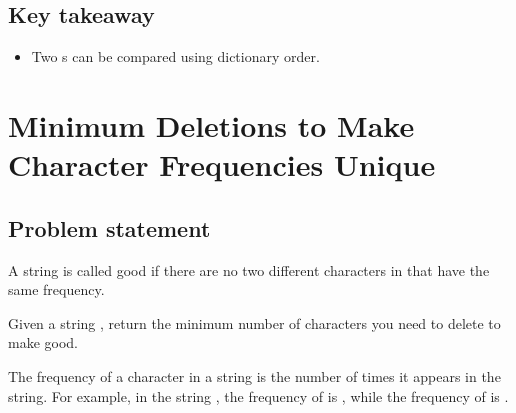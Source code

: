 \documentclass[letterpaper,12pt,english]{book}
\begin{document}
\subsection{Key takeaway}
\label{\detokenize{Sorting/04_SORT_1288_Remove_Covered_Intervals:key-takeaway}}\begin{itemize}
\item {} 
\sphinxAtStartPar
Two s can be compared using dictionary order.

\end{itemize}

\sphinxstepscope


\section{Minimum Deletions to Make Character Frequencies Unique}
\label{\detokenize{Sorting/04_SORT_1647_Minimum_Deletions_to_Make_Character_Frequencies_Unique:minimum-deletions-to-make-character-frequencies-unique}}\label{\detokenize{Sorting/04_SORT_1647_Minimum_Deletions_to_Make_Character_Frequencies_Unique::doc}}

\subsection{Problem statement\sphinxfootnotemark[77]}
\label{\detokenize{Sorting/04_SORT_1647_Minimum_Deletions_to_Make_Character_Frequencies_Unique:problem-statement}}%
\begin{footnotetext}[77]\sphinxAtStartFootnote
{}
%
\end{footnotetext}\ignorespaces 
\sphinxAtStartPar
A string  is called good if there are no two different characters in  that have the same frequency.

\sphinxAtStartPar
Given a string , return the minimum number of characters you need to delete to make  good.

\sphinxAtStartPar
The frequency of a character in a string is the number of times it appears in the string. For example, in the string , the frequency of  is , while the frequency of  is .
\end{document}

